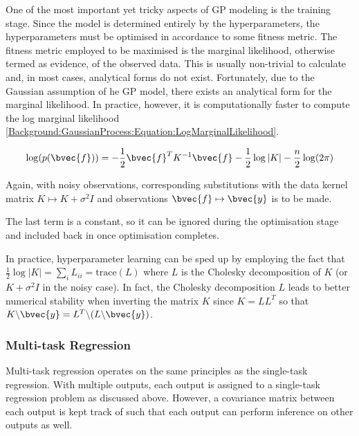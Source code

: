 				One of the most important yet tricky aspects of GP modeling is the training stage. Since the model is determined entirely by the hyperparameters, the hyperparameters must be optimised in accordance to some fitness metric. The fitness metric employed to be maximised is the marginal likelihood, otherwise termed as evidence, of the observed data. This is usually non-trivial to calculate and, in most cases, analytical forms do not exist. Fortunately, due to the Gaussian assumption of he GP model, there exists an analytical form for the marginal likelihood. In practice, however, it is computationally faster to compute the log marginal likelihood \eqref{Background:GaussianProcess:Equation:LogMarginalLikelihood}.
				
				\begin{equation}
					\log(p(\bvec{f})) = - \frac{1}{2} \bvec{f}^{T} K^{-1} \bvec{f} - \frac{1}{2} \log|K| - \frac{n}{2} \log(2 \pi)
				\label{Background:GaussianProcess:Equation:LogMarginalLikelihood}
				\end{equation}
				
				Again, with noisy observations, corresponding substitutions with the data kernel matrix $K \mapsto K + \sigma^{2} I$ and observations $\bvec{f} \mapsto \bvec{y}$ is to be made.
				
				The last term is a constant, so it can be ignored during the optimisation stage and included back in once optimisation completes.
				
				In practice, hyperparameter learning can be sped up by employing the fact that $\frac{1}{2} \log|K| = \sum_{i} L_{ii} = \mathrm{trace}(L)$ where $L$ is the Cholesky decomposition of $K$ (or $K + \sigma^{2} I$ in the noisy case). In fact, the Cholesky decomposition $L$ leads to better numerical stability when inverting the matrix $K$ since $K = LL^{T}$ so that $K \backslash \bvec{y} = L^{T} \backslash (L \backslash \bvec{y})$.
				
			\subsubsection{Multi-task Regression}
			
				Multi-task regression operates on the same principles as the single-task regression. With multiple outputs, each output is assigned to a single-task regression problem as discussed above. However, a covariance matrix between each output is kept track of such that each output can perform inference on other outputs as well.
				
